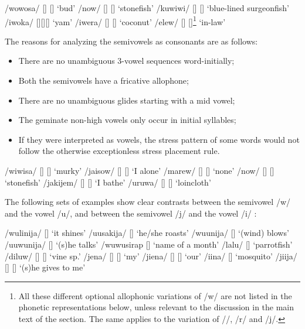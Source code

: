 \ea 
\label{ex:2:semiVw}
\ea
/wowosa/  [] {\Tilde} []  `bud'
\ex
/now/  [] {\Tilde} []  `stonefish'
\ex
/kuwiwi/  [] {\Tilde} []  `blue-lined surgeonfish'
\ex
/iwoka/  []{\Tilde}[]{\Tilde}[]  `yam'
\ex
/iwera/  [] {\Tilde} []  `coconut'
\ex
/elew/  [] {\Tilde} []\footnote{All these different optional allophonic variations of /w/ are not listed in the phonetic representations below, unless relevant to the discussion in the main text of the section. The same applies to the variation of /{\textphi}/, /r/ and /j/.}  `in-law'
\z
\z


The reasons for analyzing the semivowels as consonants are as follows:


\begin{itemize}
\item There are no unambiguous 3-vowel sequences word-initially; 
\item Both the semivowels have a fricative allophone;
\item There are no unambiguous glides starting with a mid vowel; 
\item The geminate non-high vowels only occur in initial syllables;
\item If they were interpreted as vowels, the stress pattern of some words would not follow the otherwise exceptionless stress placement rule.
\end{itemize}

\ea
\ea
/wiwisa/  [] {\Tilde} []  `murky'
\ex
/jaisow/  [] {\Tilde} []  `I alone'
\ex
/marew/  [] {\Tilde} []  `none'
\ex
/now/  [] {\Tilde} []  `stonefish'
\ex
/jakijem/  [] {\Tilde} []  `I bathe'
\ex
/uruwa/  [] {\Tilde} []  `loincloth'
\z
\z

The following sets of examples show clear contrasts between the semivowel /w/ and the vowel /u/, and between the semivowel /j/ and the vowel /i/ :

\ea 
\label{ex:2:semiV-contrasts}
\ea
/wulinija/  []  `it shines'
\ex
/uusakija/  []  `he/she roasts'
\ex
/wuunija/  []  `(wind) blows'
\ex
/uuwunija/  []  `(s)he talks'
\ex
/wuwusirap  []  `name of a month'
\ex
/lalu/  []  `parrotfish'
\ex
/diluw/  [] {\Tilde} []  `vine sp.'
\ex
/jena/  [] {\Tilde} []  `my'
\ex
/jiena/  [] {\Tilde} []  `our'
\ex
/iina/  []  `mosquito'
\ex
/jiija/  [] {\Tilde} []  `(s)he gives to me'
\z
\z

